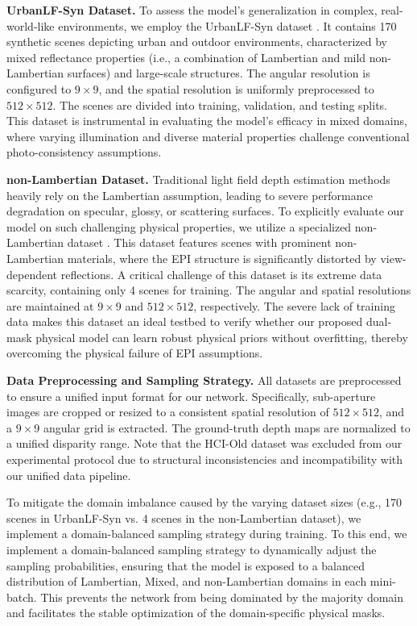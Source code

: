 \documentclass[lettersize,journal]{IEEEtran}
\begin{document}
\textbf{UrbanLF-Syn Dataset.} To assess the model's generalization in complex, real-world-like environments, we employ the UrbanLF-Syn dataset \cite{3}. It contains 170 synthetic scenes depicting urban and outdoor environments, characterized by mixed reflectance properties (i.e., a combination of Lambertian and mild non-Lambertian surfaces) and large-scale structures. The angular resolution is configured to $9 \times 9$, and the spatial resolution is uniformly preprocessed to $512 \times 512$. The scenes are divided into training, validation, and testing splits. This dataset is instrumental in evaluating the model's efficacy in mixed domains, where varying illumination and diverse material properties challenge conventional photo-consistency assumptions.

\textbf{non-Lambertian Dataset.} Traditional light field depth estimation methods heavily rely on the Lambertian assumption, leading to severe performance degradation on specular, glossy, or scattering surfaces. To explicitly evaluate our model on such challenging physical properties, we utilize a specialized non-Lambertian dataset \cite{4}. This dataset features scenes with prominent non-Lambertian materials, where the EPI structure is significantly distorted by view-dependent reflections. A critical challenge of this dataset is its extreme data scarcity, containing only 4 scenes for training. The angular and spatial resolutions are maintained at $9 \times 9$ and $512 \times 512$, respectively. The severe lack of training data makes this dataset an ideal testbed to verify whether our proposed dual-mask physical model can learn robust physical priors without overfitting, thereby overcoming the physical failure of EPI assumptions.

\textbf{Data Preprocessing and Sampling Strategy.} 
All datasets are preprocessed to ensure a unified input format for our network. Specifically, sub-aperture images are cropped or resized to a consistent spatial resolution of $512 \times 512$, and a $9 \times 9$ angular grid is extracted. The ground-truth depth maps are normalized to a unified disparity range. Note that the HCI-Old dataset was excluded from our experimental protocol due to structural inconsistencies and incompatibility with our unified data pipeline. 

To mitigate the domain imbalance caused by the varying dataset sizes (e.g., 170 scenes in UrbanLF-Syn vs. 4 scenes in the non-Lambertian dataset), we implement a domain-balanced sampling strategy during training. To this end, we implement a domain-balanced sampling strategy to dynamically adjust the sampling probabilities, ensuring that the model is exposed to a balanced distribution of Lambertian, Mixed, and non-Lambertian domains in each mini-batch. This prevents the network from being dominated by the majority domain and facilitates the stable optimization of the domain-specific physical masks.
\end{document}
